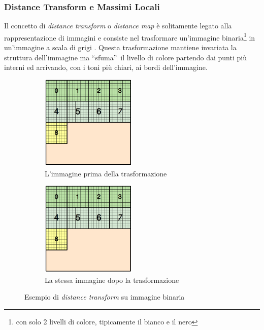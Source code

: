 {\subsubsection{Distance Transform e Massimi Locali}\label{subsubsec:local_max_map_transf}
Il concetto di \textit{distance transform} o \textit{distance map} è solitamente legato alla rappresentazione di immagini e consiste nel trasformare un'immagine binaria\footnote{con solo 2 livelli di colore, tipicamente il bianco e il nero} in un'immagine a scala di grigi \cite{distance_transform}. Questa trasformazione mantiene invariata la struttura dell'immagine ma \textquotedblleft sfuma\textquotedblright~il livello di colore partendo dai punti più interni ed arrivando, con i toni più chiari, ai bordi dell'immagine.
\begin{figure}[H]
	\centering
	\begin{subfigure}{0.5\textwidth}
	\centering
	\includegraphics[width=0.5\textwidth]{immagini/block_on_grid.png}
	\caption{L'immagine prima della trasformazione}
	\end{subfigure}%
	\begin{subfigure}{0.5\textwidth}
	\centering
	\includegraphics[width=0.5\textwidth]{immagini/block_on_grid.png}
	\caption{La stessa immagine dopo la trasformazione}
    \end{subfigure}
	\caption{Esempio di \textit{distance transform} su immagine binaria}
	\label{fig:map_transform_example}
\end{figure}

}
